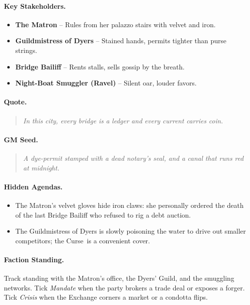 \paragraph{Key Stakeholders.}
\begin{itemize}
  \item \textbf{The Matron} -- Rules from her palazzo stairs with velvet and iron.
  \item \textbf{Guildmistress of Dyers} -- Stained hands, permits tighter than purse strings.
  \item \textbf{Bridge Bailiff} -- Rents stalls, sells gossip by the breath.
  \item \textbf{Night-Boat Smuggler (\textquotedbl Ravel\textquotedbl)} -- Silent oar, louder favors.
\end{itemize}

\paragraph{Quote.}
\begin{quote}
\emph{\textquotedbl In this city, every bridge is a ledger and every current carries coin.\textquotedbl}
\end{quote}

\paragraph{GM Seed.}
\begin{quote}
\emph{A dye-permit stamped with a dead notary's seal, and a canal that runs red at midnight.}
\end{quote}

\paragraph{Hidden Agendas.}
\begin{itemize}
  \item The Matron's velvet gloves hide iron claws: she personally ordered the death of the last Bridge Bailiff who refused to rig a debt auction.
  \item The Guildmistress of Dyers is slowly poisoning the water to drive out smaller competitors; the \textquotedbl Curse\textquotedbl\ is a convenient cover.
\end{itemize}

\paragraph{Faction Standing.}
Track standing with the Matron's office, the Dyers' Guild, and the smuggling networks. Tick \textit{Mandate} when the party brokers a trade deal or exposes a forger. Tick \textit{Crisis} when the Exchange corners a market or a condotta flips.

